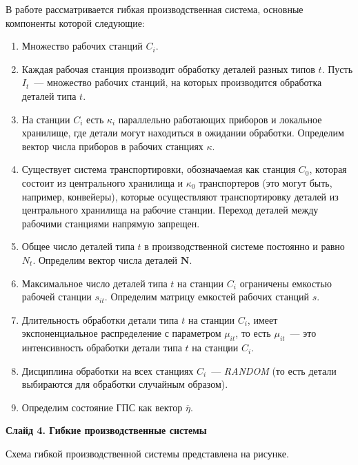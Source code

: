 \documentclass[a4paper,14pt]{extarticle}
\theoremstyle{note}
\begin{document}
В работе рассматривается гибкая производственная система, основные компоненты которой следующие:
\begin{enumerate}
\item Множество рабочих станций $C_i$.

\item Каждая рабочая станция производит обработку деталей разных типов $t$. Пусть $I_t$~--- множество рабочих станций, на которых производится обработка деталей типа $t$.

\item На станции $C_i$ есть $\kappa_i$ параллельно работающих приборов и локальное хранилище, где детали могут находиться в ожидании обработки. Определим вектор числа приборов в рабочих станциях $\kappa$.

\item Существует система транспортировки, обозначаемая как станция $C_0$, которая состоит из центрального хранилища и $\kappa_0$ транспортеров (это могут быть, например, конвейеры), которые осуществляют транспортировку деталей из центрального хранилища на рабочие станции. Переход деталей между рабочими станциями напрямую запрещен.

\item Общее число деталей типа $t$ в производственной системе постоянно и равно $N_t$. Определим вектор числа деталей $\mathbf{N}$.

\item Максимальное число деталей типа $t$ на станции $C_i$ ограничены емкостью рабочей станции $s_{it}$. Определим матрицу емкостей рабочих станций $s$.

\item Длительность обработки детали типа $t$ на станции $C_i$, имеет экспоненциальное распределение с параметром $\mu_{it}$, то есть $\mu_{it}$~--- это интенсивность обработки детали типа $t$ на станции $C_i$.

\item Дисциплина обработки на всех станциях $C_i$~--- \textit{RANDOM} (то есть детали выбираются для обработки случайным образом).

\item Определим состояние ГПС как вектор $\overline{\eta}$.
\end{enumerate}


\textbf{Слайд 4. Гибкие производственные системы}

Схема гибкой производственной системы представлена на рисунке.
\end{document}
